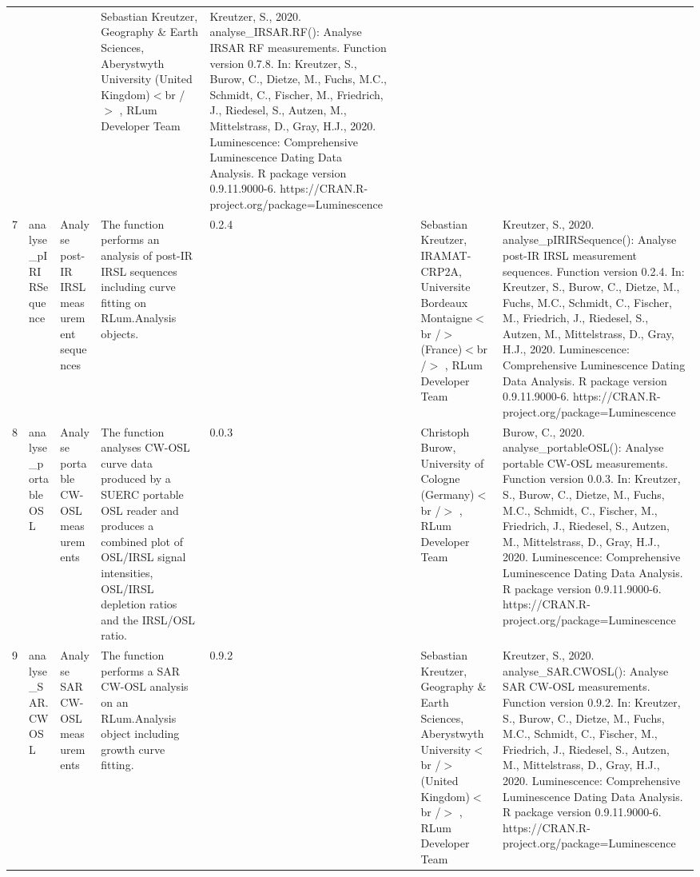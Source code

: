 \begin{table}[ht]
\begin{tabular}{rllllllll}
 &  &  & Sebastian Kreutzer, Geography \& Earth Sciences, Aberystwyth University (United Kingdom)$<$br /$>$ , RLum Developer Team & Kreutzer, S., 2020. analyse\_IRSAR.RF(): Analyse IRSAR RF measurements. Function version 0.7.8. In: Kreutzer, S., Burow, C., Dietze, M., Fuchs, M.C., Schmidt, C., Fischer, M., Friedrich, J., Riedesel, S., Autzen, M., Mittelstrass, D., Gray, H.J., 2020. Luminescence: Comprehensive Luminescence Dating Data Analysis. R package version 0.9.11.9000-6. https://CRAN.R-project.org/package=Luminescence
 \\ 
  7 & analyse\_pIRIRSequence & Analyse post-IR IRSL measurement sequences & The function performs an analysis of post-IR IRSL sequences including curve fitting on  RLum.Analysis  objects. & 0.2.4
 &  &  & Sebastian Kreutzer, IRAMAT-CRP2A, Universite Bordeaux Montaigne$<$br /$>$ (France)$<$br /$>$ , RLum Developer Team & Kreutzer, S., 2020. analyse\_pIRIRSequence(): Analyse post-IR IRSL measurement sequences. Function version 0.2.4. In: Kreutzer, S., Burow, C., Dietze, M., Fuchs, M.C., Schmidt, C., Fischer, M., Friedrich, J., Riedesel, S., Autzen, M., Mittelstrass, D., Gray, H.J., 2020. Luminescence: Comprehensive Luminescence Dating Data Analysis. R package version 0.9.11.9000-6. https://CRAN.R-project.org/package=Luminescence
 \\ 
  8 & analyse\_portableOSL & Analyse portable CW-OSL measurements & The function analyses CW-OSL curve data produced by a SUERC portable OSL reader and produces a combined plot of OSL/IRSL signal intensities, OSL/IRSL depletion ratios and the IRSL/OSL ratio. & 0.0.3
 &  &  & Christoph Burow, University of Cologne (Germany)$<$br /$>$ , RLum Developer Team & Burow, C., 2020. analyse\_portableOSL(): Analyse portable CW-OSL measurements. Function version 0.0.3. In: Kreutzer, S., Burow, C., Dietze, M., Fuchs, M.C., Schmidt, C., Fischer, M., Friedrich, J., Riedesel, S., Autzen, M., Mittelstrass, D., Gray, H.J., 2020. Luminescence: Comprehensive Luminescence Dating Data Analysis. R package version 0.9.11.9000-6. https://CRAN.R-project.org/package=Luminescence
 \\ 
  9 & analyse\_SAR.CWOSL & Analyse SAR CW-OSL measurements & The function performs a SAR CW-OSL analysis on an RLum.Analysis  object including growth curve fitting. & 0.9.2
 &  &  & Sebastian Kreutzer, Geography \& Earth Sciences, Aberystwyth University$<$br /$>$ (United Kingdom)$<$br /$>$ , RLum Developer Team & Kreutzer, S., 2020. analyse\_SAR.CWOSL(): Analyse SAR CW-OSL measurements. Function version 0.9.2. In: Kreutzer, S., Burow, C., Dietze, M., Fuchs, M.C., Schmidt, C., Fischer, M., Friedrich, J., Riedesel, S., Autzen, M., Mittelstrass, D., Gray, H.J., 2020. Luminescence: Comprehensive Luminescence Dating Data Analysis. R package version 0.9.11.9000-6. https://CRAN.R-project.org/package=Luminescence

\end{tabular}
\end{table}
